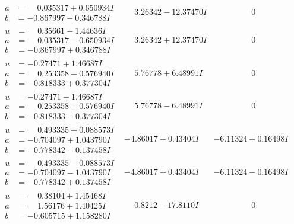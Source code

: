 \documentclass[1p]{elsarticle_modified}
\theoremstyle{definition}
\begin{document}
$$\begin{array}{c|c|c}
\begin{aligned}
a &= \phantom{-}0.035317 + 0.650934 I \\
b &= -0.867997 - 0.346788 I\end{aligned}
 & \phantom{-}3.26342 - 12.37470 I & \phantom{-0.000000 } 0 \\ \hline\begin{aligned}
u &= \phantom{-}0.35661 - 1.44636 I \\
a &= \phantom{-}0.035317 - 0.650934 I \\
b &= -0.867997 + 0.346788 I\end{aligned}
 & \phantom{-}3.26342 + 12.37470 I & \phantom{-0.000000 } 0 \\ \hline\begin{aligned}
u &= -0.27471 + 1.46687 I \\
a &= \phantom{-}0.253358 - 0.576940 I \\
b &= -0.818333 + 0.377304 I\end{aligned}
 & \phantom{-}5.76778 + 6.48991 I & \phantom{-0.000000 } 0 \\ \hline\begin{aligned}
u &= -0.27471 - 1.46687 I \\
a &= \phantom{-}0.253358 + 0.576940 I \\
b &= -0.818333 - 0.377304 I\end{aligned}
 & \phantom{-}5.76778 - 6.48991 I & \phantom{-0.000000 } 0 \\ \hline\begin{aligned}
u &= \phantom{-}0.493335 + 0.088573 I \\
a &= -0.704097 + 1.043790 I \\
b &= -0.778342 - 0.137458 I\end{aligned}
 & -4.86017 - 0.43404 I & -6.11324 + 0.16498 I \\ \hline\begin{aligned}
u &= \phantom{-}0.493335 - 0.088573 I \\
a &= -0.704097 - 1.043790 I \\
b &= -0.778342 + 0.137458 I\end{aligned}
 & -4.86017 + 0.43404 I & -6.11324 - 0.16498 I \\ \hline\begin{aligned}
u &= \phantom{-}0.38104 + 1.45468 I \\
a &= \phantom{-}1.56176 + 1.40425 I \\
b &= -0.605715 + 1.158280 I\end{aligned}
 & \phantom{-}0.8212 - 17.8110 I & \phantom{-0.000000 } 0 \\ \hline\begin{aligned}

\end{aligned}
\end{array}$$
\end{document}
